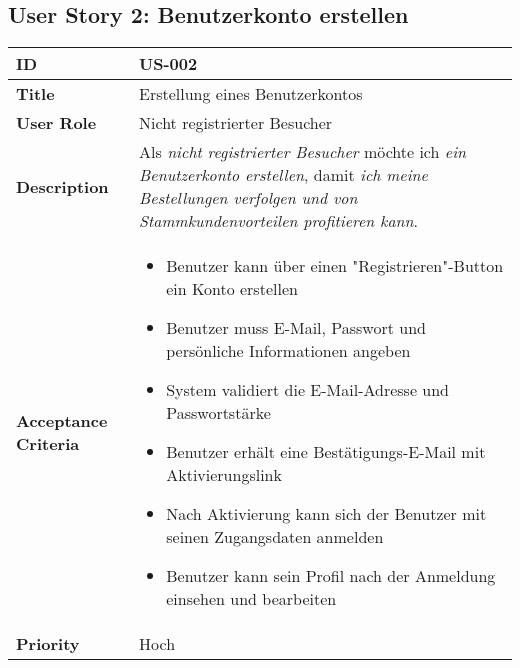 \documentclass[a4paper,11pt]{article}
\begin{document}
\subsection{User Story 2: Benutzerkonto erstellen}
\begin{tabularx}{\textwidth}{|l|X|}
    \hline
    \textbf{ID} & US-002 \\
    \hline
    \textbf{Title} & Erstellung eines Benutzerkontos \\
    \hline
    \textbf{User Role} & Nicht registrierter Besucher \\
    \hline
    \textbf{Description} & Als \textit{nicht registrierter Besucher} möchte ich \textit{ein Benutzerkonto erstellen}, damit \textit{ich meine Bestellungen verfolgen und von Stammkundenvorteilen profitieren kann}. \\
    \hline
    \textbf{Acceptance Criteria} & 
    \begin{itemize}
        \item Benutzer kann über einen "Registrieren"-Button ein Konto erstellen
        \item Benutzer muss E-Mail, Passwort und persönliche Informationen angeben
        \item System validiert die E-Mail-Adresse und Passwortstärke
        \item Benutzer erhält eine Bestätigungs-E-Mail mit Aktivierungslink
        \item Nach Aktivierung kann sich der Benutzer mit seinen Zugangsdaten anmelden
        \item Benutzer kann sein Profil nach der Anmeldung einsehen und bearbeiten
    \end{itemize} \\
    \hline
    \textbf{Priority} & Hoch \\
    \hline
\end{tabularx}
\end{document}
